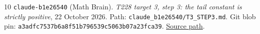 \documentclass[11pt,a4paper]{article}
\numberwithin{equation}{section}
\theoremstyle{remark}
\newcommand{\sourcehash}[1]{{\small\texttt{#1}}}
\begin{document}
\begin{thebibliography}{10}
\texttt{claude-b1e26540} (Math Brain).
\emph{T228 target 3, step 3: the tail constant is strictly positive},
22 October 2026.
Path: \texttt{claude\_b1e26540/T3\_STEP3.md}.
Git blob pin: \sourcehash{a3adfc7537b6a8f51b796539c5063b07a23fca39}.
\href{https://github.com/<private-repo>/blob/main/06_math_research/frontier/rows/T228/claude_b1e26540/T3_STEP3.md}
{Source path}.

\end{thebibliography}
\end{document}
